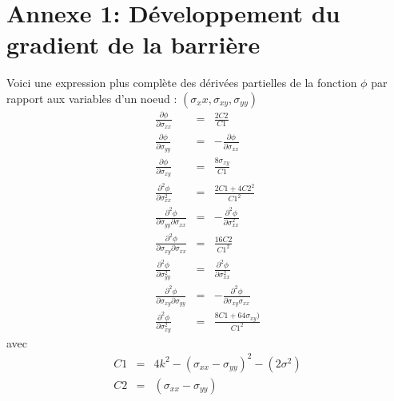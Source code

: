 \section*{Annexe 1: Développement du gradient de la barrière}
Voici une expression plus complète des dérivées partielles de la fonction $\phi$ par rapport aux variables d'un noeud : $(\sigma_xx,\sigma_{xy},\sigma_{yy})$
\begin{eqnarray*}
\frac{\partial \phi}{\partial \sigma_{xx}} & = & \frac{2C2}{C1}\\
\frac{\partial \phi}{\partial \sigma_{yy}} & = & -\frac{\partial \phi}{\partial \sigma_{xx}} \\
\frac{\partial \phi}{\partial \sigma_{xy}} & = & \frac{8\sigma_{xy}}{C1}\\
\frac{\partial^2 \phi}{\partial \sigma_{xx}^2} & = & \frac{2C1+4C2^2}{C1^2} \\
\frac{\partial^2 \phi}{\partial \sigma_{yy}\partial\sigma_{xx}} & = & -\frac{\partial^2 \phi}{\partial \sigma_{xx}^2}\\
\frac{\partial^2 \phi}{\partial \sigma_{xy}\partial\sigma_{xx}} & = & \frac{16C2}{C1^2} \\
\frac{\partial^2 \phi}{\partial \sigma_{yy}^2}& = & \frac{\partial^2 \phi}{\partial \sigma_{xx}^2}\\
\frac{\partial^2 \phi}{\partial \sigma_{xy}\partial \sigma_{yy}}& = & -\frac{\partial^2 \phi}{\partial \sigma_{xy}\sigma_{xx}}\\
\frac{\partial^2 \phi}{\partial \sigma_{xy}^2}& = & \frac{8C1+64\sigma_{xy})}{C1^2}
\end{eqnarray*}
avec 
\begin{eqnarray*}
C1 & = & 4k^2 -(\sigma_{xx}-\sigma_{yy})^2 -(2\sigma^2)\\
C2 & = & (\sigma_{xx}-\sigma_{yy})
\end{eqnarray*}